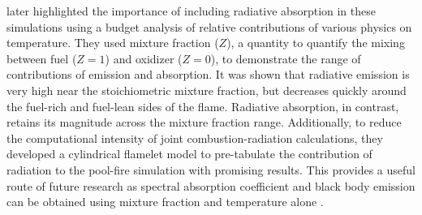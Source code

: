 \citet{Wu2021LimitationsFires} later highlighted the importance of including radiative absorption in these simulations using a budget analysis of relative contributions of various physics on temperature. 
They used mixture fraction ($Z$), a quantity to quantify the mixing between fuel ($Z=1$) and oxidizer ($Z=0$), to demonstrate the range of contributions of emission and absorption.
It was shown that radiative emission is very high near the stoichiometric mixture fraction, but decreases quickly around the fuel-rich and fuel-lean sides of the flame. Radiative absorption, in contrast, retains its magnitude across the mixture fraction range.
Additionally, to reduce the computational intensity of joint combustion-radiation calculations, they developed a cylindrical flamelet model to pre-tabulate the contribution of radiation to the pool-fire simulation with promising results.
This provides a useful route of future research as spectral absorption coefficient and black body emission can be obtained using mixture fraction and temperature alone \cite{Viskanta2010RadiativeSystems}.

